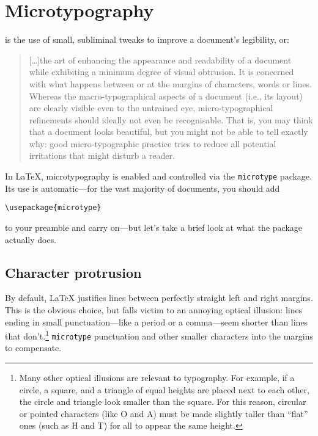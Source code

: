 \chapter{Microtypography}

 is the use of small, subliminal tweaks to improve
a document's legibility, or:
\begin{quote}
[\ldots]the art of enhancing the appearance and readability of a
document while exhibiting a minimum degree of visual obtrusion.
It is concerned with what happens between or at the margins of characters,
words or lines. Whereas the macro-typographical aspects of a document
(i.e., its layout) are clearly visible even to the untrained eye,
micro-typographical refinements should ideally not even be recognisable.
That is, you may think that a document looks beautiful, but you
might not be able to tell exactly why: good micro-typographic practice tries to
reduce all potential irritations that might disturb a reader.\punckern{}
\end{quote}

In \LaTeX{}, microtypography is enabled and controlled via the
\texttt{microtype} package.
Its use is automatic---for the vast majority of documents, you should add
\begin{leftfigure}
\begin{lstlisting}
\usepackage{microtype}
\end{lstlisting}
\end{leftfigure}
to your preamble and carry on---but let's take a brief look at what the package
actually does.

\section{Character protrusion}

By default, \LaTeX{} justifies lines between perfectly straight
left and right margins.
This is the obvious choice,
but falls victim to an annoying optical illusion:
lines ending in small punctuation---like a period or a
comma---seem shorter than lines that
don't.\punckern\footnote{Many other optical illusions are
relevant to typography. For example, if a circle, a square, and a triangle
of equal heights are placed next to each other,
the circle and triangle look smaller than the square.
For this reason, circular or pointed characters (like O and A) must
be made slightly taller than ``flat'' ones (such as H and T) for all
to appear the same height.\punckern{}}
\texttt{microtype}  punctuation and other smaller
characters into the margins to compensate.

